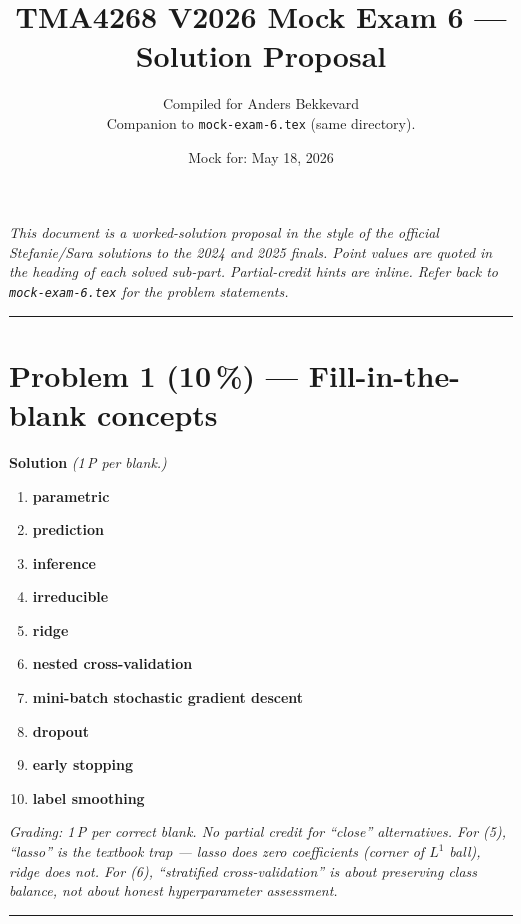 \documentclass[11pt,a4paper]{article}
\title{TMA4268 V2026 Mock Exam 6 --- Solution Proposal\\[0.3em]
\large}
\author{Compiled for Anders Bekkevard\\[0.2em]
\small Companion to \texttt{mock-exam-6.tex} (same directory).}
\date{Mock for: May 18, 2026}
\newcommand{\points}[1]{\textbf{(#1\,\%)}}
\newcommand{\sol}{\noindent\textbf{Solution}}
\begin{document}
\maketitle

\noindent\textit{This document is a worked-solution proposal in the style of the official
Stefanie/Sara solutions to the 2024 and 2025 finals. Point values are quoted in the heading of
each solved sub-part. Partial-credit hints are inline. Refer back to \texttt{mock-exam-6.tex}
for the problem statements.}

\vspace{0.6em}
\hrule
\vspace{1em}

\section*{Problem 1 \points{10} --- Fill-in-the-blank concepts}

\sol{} \emph{(1\,P per blank.)}

\begin{enumerate}[(1)]
  \item \textbf{parametric}
  \item \textbf{prediction}
  \item \textbf{inference}
  \item \textbf{irreducible}
  \item \textbf{ridge}
  \item \textbf{nested cross-validation}
  \item \textbf{mini-batch stochastic gradient descent}
  \item \textbf{dropout}
  \item \textbf{early stopping}
  \item \textbf{label smoothing}
\end{enumerate}

\noindent\emph{Grading: 1\,P per correct blank. No partial credit for ``close'' alternatives.
For (5), ``lasso'' is the textbook trap --- lasso \emph{does} zero coefficients (corner of $L^1$
ball), ridge does not. For (6), ``stratified cross-validation'' is about preserving class balance,
not about honest hyperparameter assessment.}

\vspace{0.6em}
\hrule
\vspace{1em}

\end{document}
